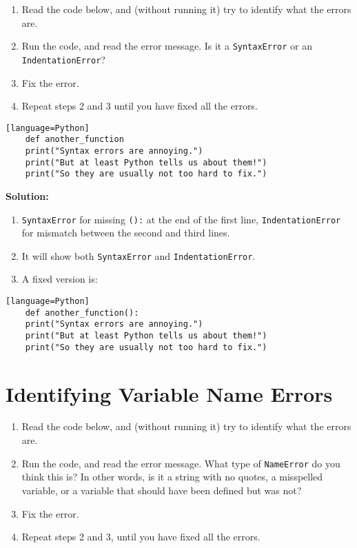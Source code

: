 \documentclass{article}
\begin{document}
	\begin{enumerate}
	\item Read the code below, and (without running it) try to identify what the errors are.
	\item Run the code, and read the error message. Is it a \texttt{SyntaxError} or an \texttt{IndentationError}?
	\item Fix the error.
	\item Repeat steps 2 and 3 until you have fixed all the errors.
	\end{enumerate}
	
	\begin{verbatim}[language=Python]
	def another_function
	print("Syntax errors are annoying.")
	print("But at least Python tells us about them!")
	print("So they are usually not too hard to fix.")
	\end{verbatim}
	
	\textbf{Solution:}
	
	\begin{enumerate}
	\item \texttt{SyntaxError} for missing \texttt{():} at the end of the first line, \texttt{IndentationError} for mismatch between the second and third lines.
	\item It will show both \texttt{SyntaxError} and \texttt{IndentationError}.
	\item A fixed version is:
	\end{enumerate}
	
	\begin{verbatim}[language=Python]
	def another_function():
	print("Syntax errors are annoying.")
	print("But at least Python tells us about them!")
	print("So they are usually not too hard to fix.")
	\end{verbatim}
	
	\section{Identifying Variable Name Errors}
	
	\begin{enumerate}
		\item Read the code below, and (without running it) try to identify what the errors are.
		\item Run the code, and read the error message. What type of \texttt{NameError} do you think this is? In other words, is it a string with no quotes, a misspelled variable, or a variable that should have been defined but was not?
		\item Fix the error.
		\item Repeat steps 2 and 3, until you have fixed all the errors.
	\end{enumerate}
	
\end{document}

